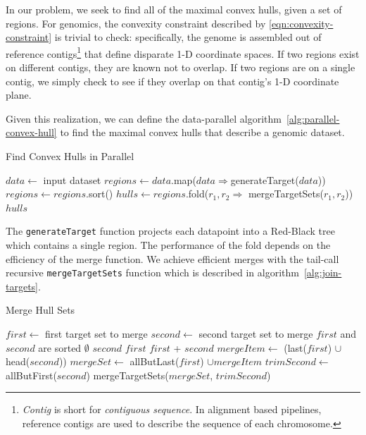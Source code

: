 \documentclass[masters]{ucbthesis}
\begin{document}
In our problem, we seek to find all of the maximal convex hulls, given a set of regions. For genomics, the
convexity constraint described by \eqref{eqn:convexity-constraint} is trivial to check: specifically, the
genome is assembled out of reference contigs\footnote{\emph{Contig} is short for \emph{contiguous
sequence}. In alignment based pipelines, reference contigs are  used to describe the sequence of each
chromosome.} that define disparate 1-D coordinate spaces. If two regions exist on different contigs, they
are known not to overlap. If two regions are on a single contig, we simply check to see if they overlap
on that contig's 1-D coordinate plane.

Given this realization, we can define the data-parallel algorithm~\ref{alg:parallel-convex-hull} to find the
maximal convex hulls that describe a genomic dataset.

\begin{algorithm}
\caption{Find Convex Hulls in Parallel}
\label{alg:parallel-convex-hull}
\begin{algorithmic}
\STATE $data \leftarrow$ input dataset
\STATE $regions \leftarrow data$.map($data \Rightarrow $generateTarget($data$))
\STATE $regions \leftarrow regions$.sort()
\STATE $hulls \leftarrow regions$.fold($r_1, r_2 \Rightarrow$ mergeTargetSets($r_1, r_2$))
\RETURN $hulls$
\end{algorithmic}
\end{algorithm}

The \texttt{generateTarget} function projects each datapoint into a Red-Black tree which contains a
single region. The performance of the fold depends on the efficiency of the merge function. We achieve
efficient merges with the tail-call recursive \texttt{mergeTargetSets} function which is described in
algorithm~\ref{alg:join-targets}.

\begin{algorithm}
\caption{Merge Hull Sets}
\label{alg:join-targets}
\begin{algorithmic}
\STATE $first \leftarrow$ first target set to merge
\STATE $second \leftarrow$ second target set to merge
\REQUIRE $first$ and $second$ are sorted
\RETURN $\emptyset$
\RETURN $second$
\RETURN $first$
\ELSE
{}
\RETURN $first$ + $second$
\ELSE
\STATE $mergeItem \leftarrow$ (last($first$) $\cup$ head($second$))
\STATE $mergeSet \leftarrow$ allButLast($first$) $\cup mergeItem$
\STATE $trimSecond \leftarrow$ allButFirst($second$)
\RETURN mergeTargetSets($mergeSet$, $trimSecond$)
\ENDIF
\ENDIF
\end{algorithmic}
\end{algorithm}
\end{document}
